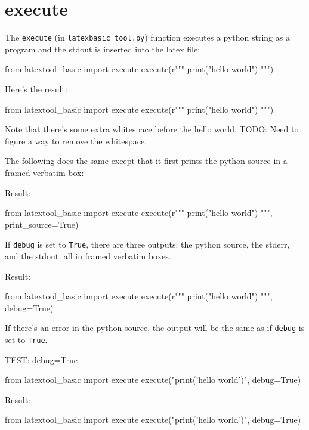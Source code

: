 \section{execute}
The \verb!execute! (in \verb!latexbasic_tool.py!) 
function executes a python string as a program
and the stdout is inserted into the latex file:
\begin{console}
\begin{python}
from latextool_basic import execute
execute(r"""
print("hello world")
""")
\end{python}
\end{console}
Here's the result:
\begin{python}
from latextool_basic import execute
execute(r"""
print("hello world")
""")
\end{python}

Note that there's some extra whitespace before the hello world.
TODO: Need to figure a way to remove the whitespace.

The following does the same except that it first prints
the python source in a framed verbatim box:
\begin{console}
Result:
\begin{python}
from latextool_basic import execute
execute(r"""
print("hello world")
""", print_source=True)
\end{python}
\end{console}

If \verb!debug! is set to \verb!True!, there are three
outputs: the python source, the stderr, and the stdout, all
in framed verbatim boxes.
\begin{console}
Result:
\begin{python}
from latextool_basic import execute
execute(r"""
print("hello world")
""", debug=True)
\end{python}
\end{console}
If there's an error in the python source, the output will be the same as if
\verb!debug! is set to \verb!True!.




TEST: debug=True
\begin{console}
from latextool_basic import execute
execute("print('hello world')", debug=True)
\end{console}
Result:
\begin{python}
from latextool_basic import execute
execute("print('hello world')", debug=True)
\end{python}





